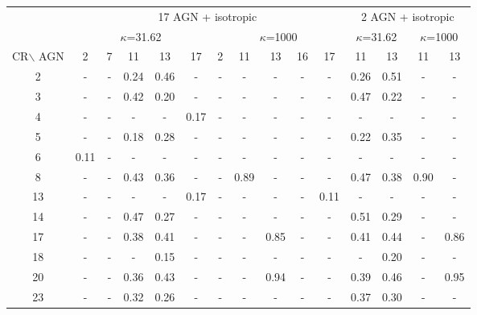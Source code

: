 \begin{sidewaystable}
\begin{center}
\begin{tabular}{|c|c|c|c|c|c|c|c|c|c|c|c|c|c|c|}

  \hline
  & \multicolumn{10}{|c|}{17 AGN + isotropic} & \multicolumn{4}{|c|}{2 AGN + isotropic} \\
  \cline{2-15}
  & \multicolumn{5}{|c|}{$\kappa$=31.62} & \multicolumn{5}{|c|}{$\kappa$=1000}& \multicolumn{2}{|c|}{$\kappa$=31.62} & \multicolumn{2}{|c|}{$\kappa$=1000} \\
   \cline{2-15}
  CR$\backslash$ AGN &
        2  &   7  &  11  &  13  &  17  &   2   &   11   &   13   &   16  &   17  &   11  &   13  &   11   &   13  \\
  \hline
  2 &   -  &   -  & 0.24 & 0.46 &   -  &   -   &   -    &    -   &   -    &   -    & 0.26  & 0.51  &   -    &   -   \\
  3 &   -  &   -  & 0.42 & 0.20 &   -  &   -   &   -    &    -   &   -    &   -    & 0.47  & 0.22  &   -    &   -   \\
  4 &   -  &   -  &   -  &    - & 0.17 &   -   &   -    &    -   &   -    &   -    &   -   &    -  &   -    &   -   \\
  5 &   -  &   -  & 0.18 & 0.28 &   -  &   -   &   -    &    -   &   -    &   -    & 0.22  & 0.35  &   -    &   -   \\
  6 & 0.11 &   -  &   -  &   -  &   -  &   -   &   -    &    -   &   -    &   -    &   -   &   -   &   -    &   -   \\
  8 &   -  &   -  & 0.43 & 0.36 &   -  &   -   & 0.89   &    -   &   -    &   -    & 0.47  & 0.38  & 0.90   &   -   \\
 13 &   -  &   -  &   -  &   -  & 0.17 &   -   &   -    &   -    &   -    & 0.11   &   -   &   -   &   -    &   -   \\
 14 &   -  &   -  & 0.47 & 0.27 &   -  &   -   &   -    &   -    &   -    &   -    & 0.51  & 0.29  &   -    &   -   \\
 \hline
 17 &   -  &   -  & 0.38 & 0.41 &   -  &   -   &   -    & 0.85   &   -    &   -    & 0.41  & 0.44  &   -    & 0.86  \\
 18 &   -  &   -  &   -  & 0.15 &   -  &   -   &   -    &   -    &   -    &   -    &   -   & 0.20  &   -    &   -   \\
 20 &   -  &   -  & 0.36 & 0.43 &   -  &   -   &   -    & 0.94   &   -    &   -    & 0.39  & 0.46  &   -    & 0.95  \\
 23 &   -  &   -  & 0.32 & 0.26 &   -  &   -   &   -    &   -    &   -    &   -    & 0.37  & 0.30  &   -    &   -   \\

\end{tabular}
\end{center}
\end{sidewaystable}
